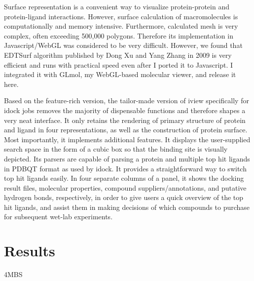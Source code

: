 \documentclass{bioinfo}
\begin{document}
\begin{methods}
Surface representation is a convenient way to visualize protein-protein and protein-ligand interactions. However, surface calculation of macromolecules is computationally and memory intensive. Furthermore, calculated mesh is very complex, often exceeding 500,000 polygons. Therefore its implementation in Javascript/WebGL was considered to be very difficult. However, we found that EDTSurf algorithm published by Dong Xu and Yang Zhang in 2009 is very efficient and runs with practical speed even after I ported it to Javascript. I integrated it with GLmol, my WebGL-based molecular viewer, and release it here.

Based on the feature-rich version, the tailor-made version of iview specifically for idock jobs removes the majority of dispensable functions and therefore shapes a very neat interface. It only retains the rendering of primary structure of protein and ligand in four representations, as well as the construction of protein surface. Most importantly, it implements additional features. It displays the user-supplied search space in the form of a cubic box so that the binding site is visually depicted. Its parsers are capable of parsing a protein and multiple top hit ligands in PDBQT format as used by idock. It provides a straightforward way to switch top hit ligands easily. In four separate columns of a panel, it shows the docking result files, molecular properties, compound suppliers/annotations, and putative hydrogen bonds, respectively, in order to give users a quick overview of the top hit ligands, and assist them in making decisions of which compounds to purchase for subsequent wet-lab experiments.

\end{methods}

\section{Results}

4MBS \citep{1348}
\end{document}
